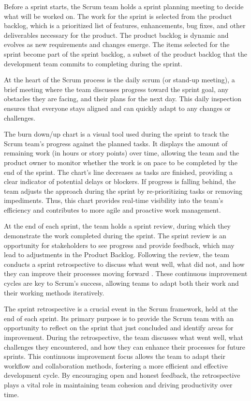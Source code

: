 Before a sprint starts, the Scrum team holds a sprint planning meeting to decide what will
be worked on. The work for the sprint is selected from the product backlog, which is a
prioritized list of features, enhancements, bug fixes, and other deliverables necessary
for the product\nocite{schwaber2020scrum}. The product backlog is dynamic and evolves as
new requirements and changes emerge. The items selected for the sprint become part of the
sprint backlog, a subset of the product backlog that the development team commits to
completing during the sprint.

At the heart of the Scrum process is the daily scrum (or stand-up meeting), a brief
meeting where the team discusses progress toward the sprint goal, any obstacles they are
facing, and their plans for the next day. This daily inspection ensures that everyone
stays aligned and can quickly adapt to any changes or challenges\nocite{cobb2015scrum}.

The burn down/up chart is a visual tool used during the sprint to track the Scrum
team's progress against the planned tasks. It displays the amount of remaining work (in
hours or story points) over time, allowing the team and the product owner to monitor
whether the work is on pace to be completed by the end of the sprint. The chart's line
decreases as tasks are finished, providing a clear indicator of potential delays or
blockers. If progress is falling behind, the team adjusts the approach during the
sprint by re-prioritizing tasks or removing impediments. Thus, this chart provides
real-time visibility into the team’s efficiency and contributes to more agile and
proactive work management.

At the end of each sprint, the team holds a sprint review, during which they demonstrate
the work completed during the sprint. The sprint review is an opportunity for stakeholders
to see progress and provide feedback, which may lead to adjustments in the Product
Backlog. Following the review, the team conducts a sprint retrospective to discuss what
went well, what did not, and how they can improve their processes moving forward%
\nocite{rubin2012sprints}. These continuous improvement cycles are key to Scrum's success,
allowing teams to adapt both their work and their working methods iteratively.

The sprint retrospective is a crucial event in the Scrum framework, held at the end of
each sprint. Its primary purpose is to provide the Scrum team with an opportunity to
reflect on the sprint that just concluded and identify areas for improvement. During the
retrospective, the team discusses what went well, what challenges they encountered, and
how they can enhance their processes for future sprints. This continuous improvement focus
allows the team to adapt their workflow and collaboration methods, fostering a more
efficient and effective development cycle. By encouraging open and honest feedback, the
retrospective plays a vital role in maintaining team cohesion and driving productivity
over time.

